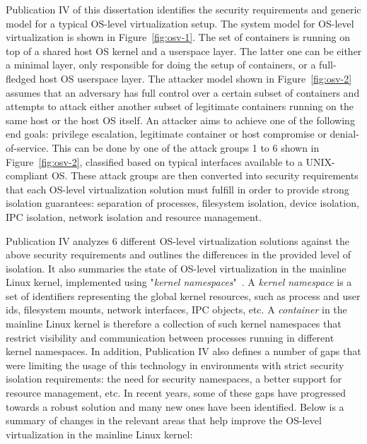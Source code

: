 Publication IV of this dissertation identifies the security requirements and generic model for a typical OS-level virtualization setup.
The system model for OS-level virtualization is shown in Figure~\ref{fig:osv-1}. The set of containers  is running on top of a shared host OS kernel and a userspace layer. The latter one can be either a minimal layer, only responsible for doing the setup of containers, or a full-fledged host OS userspace layer. The attacker model shown in Figure~\ref{fig:osv-2} assumes that an adversary has full control over a certain subset of containers and attempts to attack either another subset of legitimate containers running on the same host or the host OS itself. An attacker aims to achieve one of the following end goals: privilege escalation, legitimate container or host compromise or denial-of-service. This can be done by one of the attack groups 1 to 6 shown in Figure~\ref{fig:osv-2}, classified based on typical interfaces available to a UNIX-compliant OS. These attack groups are then converted into security requirements that each OS-level virtualization solution must fulfill in order to provide strong isolation guarantees: separation of processes, filesystem isolation, device isolation, IPC isolation, network isolation and resource management.   

Publication IV analyzes 6 different OS-level virtualization solutions against the above security requirements and outlines the differences in the provided level of isolation. It also summaries the state of OS-level virtualization in the mainline Linux kernel, implemented using "\textit{kernel namespaces}"~\cite{biederman2006}. A \textit{kernel namespace} is a set of identifiers representing the global kernel resources, such as process and user ids, filesystem mounts, network interfaces, IPC objects, etc. A \textit{container} in the mainline Linux kernel is therefore a collection of such kernel namespaces that restrict visibility and communication between processes running in different kernel namespaces. In addition, Publication IV also defines a number of gaps that were limiting the usage of this technology in environments with strict security isolation requirements: the need for security namespaces, a better support for resource management, etc. In recent years, some of these gaps have progressed towards a robust solution and many new ones have been identified. Below is a summary of changes in the relevant areas that help improve the OS-level virtualization in the mainline Linux kernel:  

